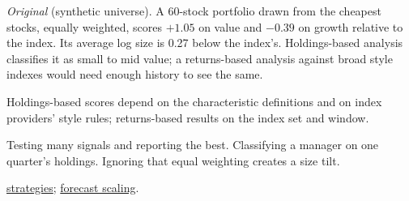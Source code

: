 \begin{qfmethod}
 \emph{Original} (synthetic universe). A 60-stock portfolio drawn from the cheapest stocks, equally weighted, scores $+1.05$ on value and $-0.39$ on growth relative to the index. Its average log size is 0.27 below the index's. Holdings-based analysis classifies it as small to mid value; a returns-based analysis against broad style indexes would need enough history to see the same.

 Holdings-based scores depend on the characteristic definitions and on index providers' style rules; returns-based results on the index set and window.

 Testing many signals and reporting the best. Classifying a manager on one quarter's holdings. Ignoring that equal weighting creates a size tilt.

 \hyperref[def:active-equity-strategies]{strategies}; \hyperref[meth:forecast-scaling-ic]{forecast scaling}.

\end{qfmethod}

